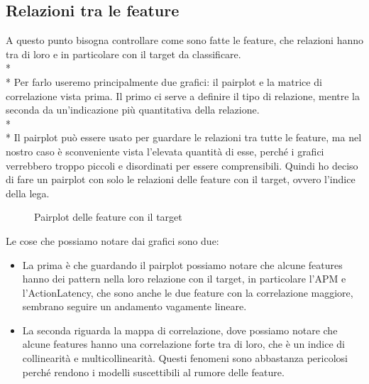 \subsection{Relazioni tra le feature}\label{ssec:relazioni}
\normalsize
\par
A questo punto bisogna controllare come sono fatte le feature, che relazioni hanno tra di loro e in particolare con il target da classificare.\\*\\*
Per farlo useremo principalmente due grafici: il pairplot e la matrice di correlazione vista prima. Il primo ci serve a definire il tipo di relazione, mentre la seconda da un'indicazione più quantitativa della relazione.\\*\\*
Il pairplot può essere usato per guardare le relazioni tra tutte le feature, ma nel nostro caso è sconveniente vista l’elevata quantità di esse, perché i grafici verrebbero troppo piccoli e disordinati per essere comprensibili. Quindi ho deciso di fare un pairplot con solo le relazioni delle feature con il target, ovvero l’indice della lega.
\begin{figure}[htp]
	\caption{Pairplot delle feature con il target}
\end{figure}
\par
Le cose che possiamo notare dai grafici sono due:
\begin{itemize}
	\item La prima è che guardando il pairplot possiamo notare che alcune features hanno dei pattern nella loro relazione con il target, in particolare l’APM e l’ActionLatency, che sono anche le due feature con la correlazione maggiore, sembrano seguire un andamento vagamente lineare.
	\item La seconda riguarda la mappa di correlazione, dove possiamo notare che alcune features hanno una correlazione forte tra di loro, che è un indice di collinearità e multicollinearità. Questi fenomeni sono abbastanza pericolosi perché rendono i modelli suscettibili al rumore delle feature.
\end{itemize}
